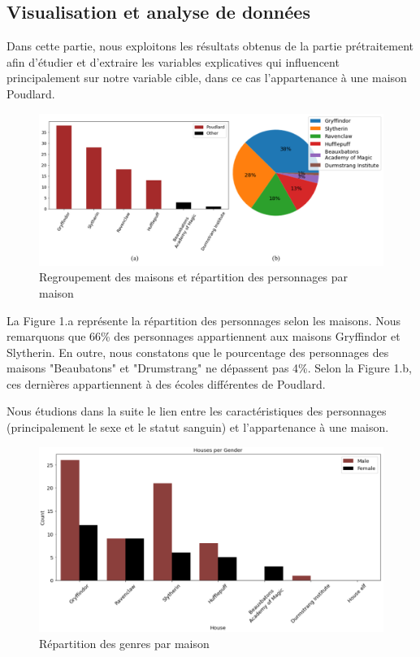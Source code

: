 \documentclass[11pt]{article}
\begin{document}
\subsection{Visualisation et analyse de données}

Dans cette partie, nous exploitons les résultats obtenus de la partie prétraitement afin d'étudier et d'extraire les variables explicatives qui influencent principalement sur notre variable cible, dans ce cas l’appartenance à une maison Poudlard.\par

\begin{figure}[hbt!]
    \centering
    \includegraphics[width= 18 cm]{./figures/rep-houses.png}
    \caption{Regroupement des maisons et répartition des personnages par maison}
\end{figure}

La Figure 1.a représente la répartition des personnages selon les maisons. Nous remarquons que 66\% des personnages appartiennent aux maisons Gryffindor et Slytherin. En outre, nous constatons que le pourcentage des personnages des maisons "Beaubatons" et "Drumstrang" ne dépassent pas 4\%. Selon la Figure 1.b, ces dernières appartiennent à des écoles différentes de Poudlard.\par

Nous étudions dans la suite le lien entre les caractéristiques des personnages (principalement le sexe et le statut sanguin) et l'appartenance à une maison.\par

\begin{figure}[hbt!]
    \centering
    \includegraphics[width= 16 cm]{./figures/gender.png}
    \caption{Répartition des genres par maison}
\end{figure}
\FloatBarrier
\end{document}
